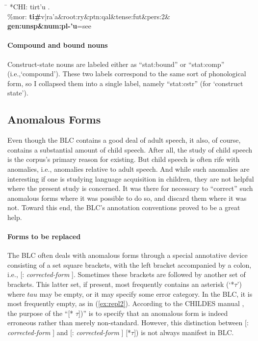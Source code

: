 \begin{exe}
\ex \begin{tabbing} \label{ex:pre:v:suf}
\hspace{0.6in} \= \hspace{5.5in} \kill
\textsf{*\ac{CH}I:} \> \textsf{tirt\a'{u} .} \\
\textsf{\%mor:} \> \textbf{\textsf{ti}\#}\textsf{v|ra\a'{a}\&root:ry\&ptn:qal\&tense:fut\&pers:2\&
\textbf{gen:unsp\&num:pl-\a'{u}}=see}
\end{tabbing}
\end{exe}

\paragraph{Compound and bound nouns}
Construct-state nouns are labeled either as ``\textsf{stat:bound}'' 
or ``\textsf{stat:comp}'' (i.e.,`compound'). 
These two labels correspond to the same sort of phonological form, 
 so I collapsed them into a single label, namely 
``\textsf{stat:cstr}'' (for `construct state').


\subsection{Anomalous Forms}\label{sec:anomolous}

Even though the \ac{BLC} contains a good deal of adult speech, it also, 
of course, contains a substantial amount of child speech. After all, the study of
child speech is the corpus's primary reason for existing. But child speech is often rife
with anomalies, i.e., anomalies relative to adult speech. And while such anomalies are 
interesting if one is studying language acquisition in children, they are not helpful where
the present study is concerned. It was there for necessary to ``correct'' such anomalous 
forms where it was possible to do so, and discard them where it was not. Toward this end, 
the \ac{BLC}'s annotation conventions proved to be a great help.

\paragraph{Forms to be replaced}
The \ac{BLC} often deals with anomalous forms through a special 
annotative device consisting of a set square brackets, with the left bracket 
accompanied
by a colon, i.e., \textsf{[: \textit{corrected-form} ]}. Sometimes these brackets 
are followed by another set
of brackets. This latter set, if present, most frequently contains an asterisk 
(`*$\tau$') where $tau$ may be empty, or it may specify some error category. 
In the \ac{BLC}, it is most frequently empty, as in (\ref{ex:repl2}). 
According to the CHILDES manual \citep{macwhinney:2000b}, the purpose of the ``\textsf{[* $\tau$])}'' 
is to specify that an anomalous form is 
indeed erroneous rather than merely non-standard. 
However, this distinction between 
\textsf{[: \textit{corrected-form} ]} and 
\textsf{[: \textit{corrected-form} ] [*{$\tau$}])} is not always manifest in \ac{BLC}.

